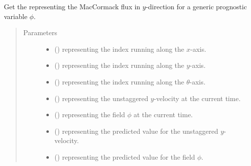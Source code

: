 \documentclass[letterpaper,10pt,english]{sphinxmanual}
\begin{document}
\begin{fulllineitems}

\begin{fulllineitems}
\label{\detokenize{api:dycore.flux_isentropic.FluxIsentropicMacCormack._get_maccormack_flux_y}}
Get the  representing the MacCormack flux in \(y\)-direction for a
generic prognostic variable \(\phi\).
\begin{quote}\begin{description}
\item[{Parameters}] \leavevmode\begin{itemize}
\item {} 
 () \textendash{}  representing the index running along the \(x\)-axis.

\item {} 
 () \textendash{}  representing the index running along the \(y\)-axis.

\item {} 
 () \textendash{}  representing the index running along the \(\theta\)-axis.

\item {} 
 () \textendash{}  representing the unstaggered \(y\)-velocity at the current time.

\item {} 
 () \textendash{}  representing the field \(\phi\) at the current time.

\item {} 
 () \textendash{}  representing the predicted value for the unstaggered \(y\)-velocity.

\item {} 
 () \textendash{}  representing the predicted value for the field \(\phi\).


\end{itemize}
\end{description}
\end{quote}
\end{fulllineitems}
\end{fulllineitems}
\end{document}

